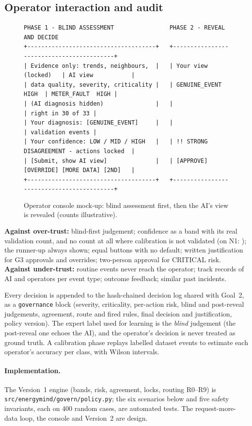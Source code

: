 \subsection{Operator interaction and audit}
\begin{figure}[htbp]
\centering
\begin{lstlisting}[basicstyle=\ttfamily\scriptsize,breaklines=false]
PHASE 1 - BLIND ASSESSMENT                PHASE 2 - REVEAL AND DECIDE
+-------------------------------------+   +------------------------------------------+
| Evidence only: trends, neighbours,  |   | Your view (locked)   | AI view           |
| data quality, severity, criticality |   | GENUINE_EVENT  HIGH  | METER_FAULT  HIGH |
| (AI diagnosis hidden)               |   |                      | right in 30 of 33 |
| Your diagnosis: [GENUINE_EVENT]     |   |                      | validation events |
| Your confidence: LOW / MID / HIGH   |   | !! STRONG DISAGREEMENT - actions locked  |
| [Submit, show AI view]              |   | [APPROVE] [OVERRIDE] [MORE DATA] [2ND]   |
+-------------------------------------+   +------------------------------------------+
\end{lstlisting}
\caption{Operator console mock-up: blind assessment first, then the AI's view is revealed (counts illustrative).}
\label{fig:console}
\end{figure}
\textbf{Against over-trust:} blind-first judgement; confidence as a band with its real validation count, and no
count at all where calibration is not validated (on N1: \SD); the runner-up always shown; equal buttons with no
default; written justification for G3 approvals and overrides; two-person approval for CRITICAL risk.
\textbf{Against under-trust:} routine events never reach the operator; track records of AI and operators per event
type; outcome feedback; similar past incidents.

Every decision is appended to the hash-chained decision log shared with Goal~2, as a \texttt{governance} block
(severity, criticality, per-action risk, blind and post-reveal judgements, agreement, route and fired rules, final
decision and justification, policy version). The expert label used for learning is the \emph{blind} judgement
(the post-reveal one echoes the AI), and the operator's decision is never treated as ground truth. A calibration
phase replays labelled dataset events to estimate each operator's accuracy per class, with Wilson intervals.

\paragraph{Implementation.} The Version~1 engine (bands, risk, agreement, locks, routing R0--R9) is
\texttt{src/energymind/govern/policy.py}; the six scenarios below and five safety invariants, each on 400 random
cases, are automated tests. The request-more-data loop, the console and Version~2 are design.

